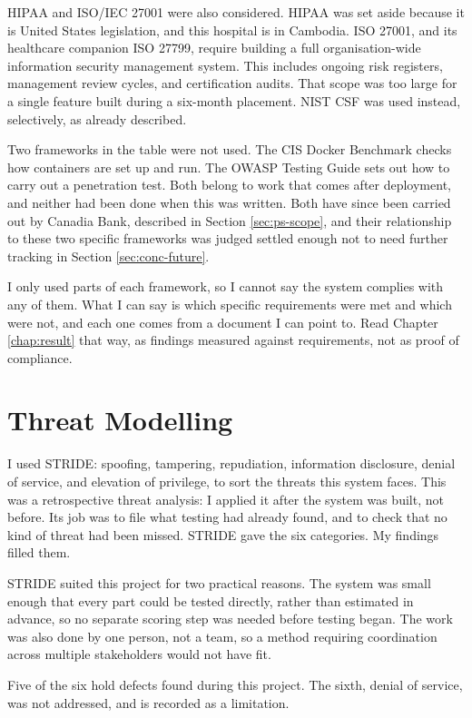 HIPAA and ISO/IEC 27001 were also considered. HIPAA was set aside because it is United States legislation, and this hospital is in Cambodia. ISO 27001, and its healthcare companion ISO 27799, require building a full organisation-wide information security management system. This includes ongoing risk registers, management review cycles, and certification audits. That scope was too large for a single feature built during a six-month placement. NIST CSF was used instead, selectively, as already described.

Two frameworks in the table were not used. The CIS Docker Benchmark checks how containers are set up and run. The OWASP Testing Guide sets out how to carry out a penetration test. Both belong to work that comes after deployment, and neither had been done when this was written. Both have since been carried out by Canadia Bank, described in Section \ref{sec:ps-scope}, and their relationship to these two specific frameworks was judged settled enough not to need further tracking in Section \ref{sec:conc-future}.

I only used parts of each framework, so I cannot say the system complies with any of them. What I can say is which specific requirements were met and which were not, and each one comes from a document I can point to. Read Chapter \ref{chap:result} that way, as findings measured against requirements, not as proof of compliance.

\section{Threat Modelling}
\label{sec:met-threat}

I used STRIDE: spoofing, tampering, repudiation, information disclosure, denial of service, and elevation of privilege, to sort the threats this system faces. This was a retrospective threat analysis: I applied it after the system was built, not before. Its job was to file what testing had already found, and to check that no kind of threat had been missed. STRIDE gave the six categories. My findings filled them.

STRIDE suited this project for two practical reasons. The system was small enough that every part could be tested directly, rather than estimated in advance, so no separate scoring step was needed before testing began. The work was also done by one person, not a team, so a method requiring coordination across multiple stakeholders would not have fit.

Five of the six hold defects found during this project. The sixth, denial of service, was not addressed, and is recorded as a limitation.

